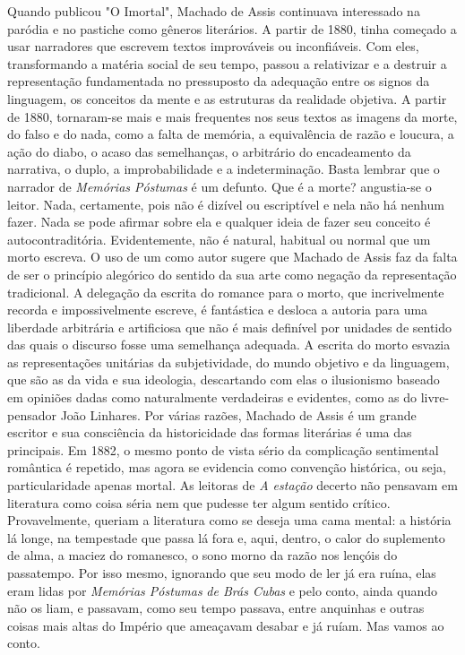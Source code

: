 Quando publicou "O Imortal", Machado de Assis continuava interessado na
paródia e no pastiche como gêneros literários. A partir de 1880, tinha
começado a usar narradores que escrevem textos improváveis ou
inconfiáveis. Com eles, transformando a matéria social de seu tempo,
passou a relativizar e a destruir a representação fundamentada no
pressuposto da adequação entre os signos da linguagem, os conceitos da
mente e as estruturas da realidade objetiva. A partir de 1880,
tornaram-se mais e mais frequentes nos seus textos as imagens da morte,
do falso e do nada, como a falta de memória, a equivalência de razão e
loucura, a ação do diabo, o acaso das semelhanças, o arbitrário do
encadeamento da narrativa, o duplo, a improbabilidade e a
indeterminação. Basta lembrar que o narrador de \emph{Memórias Póstumas}
é um defunto. Que é a morte? angustia-se o leitor. Nada, certamente,
pois não é dizível ou escriptível e nela não há nenhum fazer. Nada se
pode afirmar sobre ela e qualquer ideia de fazer seu conceito é
autocontraditória. Evidentemente, não é natural, habitual ou normal que
um morto escreva. O uso de um como autor sugere que Machado de Assis faz
da falta de ser o princípio alegórico do sentido da sua arte como
negação da representação tradicional. A delegação da escrita do romance
para o morto, que incrivelmente recorda e impossivelmente escreve, é
fantástica e desloca a autoria para uma liberdade arbitrária e
artificiosa que não é mais definível por unidades de sentido das quais o
discurso fosse uma semelhança adequada. A escrita do morto esvazia as
representações unitárias da subjetividade, do mundo objetivo e da
linguagem, que são as da vida e sua ideologia, descartando com elas o
ilusionismo baseado em opiniões dadas como naturalmente verdadeiras e
evidentes, como as do livre-pensador João Linhares. Por várias razões,
Machado de Assis é um grande escritor e sua consciência da historicidade
das formas literárias é uma das principais. Em 1882, o mesmo ponto de
vista sério da complicação sentimental romântica é repetido, mas agora
se evidencia como convenção histórica, ou seja, particularidade apenas
mortal. As leitoras de \emph{A estação} decerto não pensavam em
literatura como coisa séria nem que pudesse ter algum sentido crítico.
Provavelmente, queriam a literatura como se deseja uma cama mental: a
história lá longe, na tempestade que passa lá fora e, aqui, dentro, o
calor do suplemento de alma, a maciez do romanesco, o sono morno da
razão nos lençóis do passatempo. Por isso mesmo, ignorando que seu modo
de ler já era ruína, elas eram lidas por \emph{Memórias Póstumas}
\emph{de Brás Cubas} e pelo conto, ainda quando não os liam, e passavam,
como seu tempo passava, entre anquinhas e outras coisas mais altas do
Império que ameaçavam desabar e já ruíam. Mas vamos ao conto.

